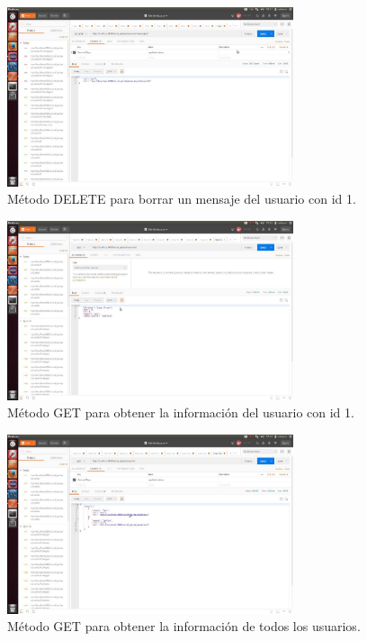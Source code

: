 \documentclass[12pt,a4paper, spanish]{article}
\begin{document}
\begin{figure}[H]
	\centering
	\includegraphics[width=0.75\textwidth]{images/captura2.jpg}
	\caption{Método DELETE para borrar un mensaje del usuario con id 1.}
\end{figure}

\begin{figure}[H]
	\centering
	\includegraphics[width=0.75\textwidth]{images/captura3.jpg}
	\caption{Método GET para obtener la información del usuario con id 1.}
\end{figure}

\begin{figure}[H]
	\centering
	\includegraphics[width=0.75\textwidth]{images/captura4.jpg}
	\caption{Método GET para obtener la información de todos los usuarios.}
\end{figure}
\end{document}

